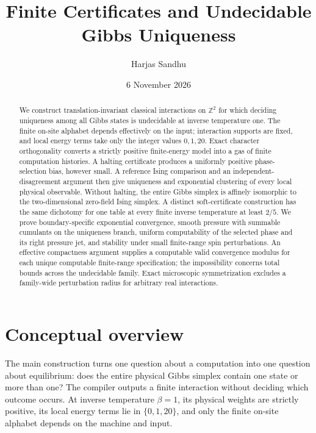 \documentclass[11pt,reqno]{amsart}
\title[Finite certificates and Gibbs uniqueness]{Finite Certificates and Undecidable Gibbs Uniqueness}
\author{Harjas Sandhu}
\date{6 November 2026}
\numberwithin{equation}{section}
\theoremstyle{definition}
\theoremstyle{remark}
\newcommand{\Z}{\mathbb Z}
\begin{document}
\raggedbottom
\begin{abstract}
We construct translation-invariant classical interactions on $\Z^2$ for which deciding uniqueness among all Gibbs states is undecidable at inverse temperature one. The finite on-site alphabet depends effectively on the input; interaction supports are fixed, and local energy terms take only the integer values $0,1,20$. Exact character orthogonality converts a strictly positive finite-energy model into a gas of finite computation histories. A halting certificate produces a uniformly positive phase-selection bias, however small. A reference Ising comparison and an independent-disagreement argument then give uniqueness and exponential clustering of every local physical observable. Without halting, the entire Gibbs simplex is affinely isomorphic to the two-dimensional zero-field Ising simplex. A distinct soft-certificate construction has the same dichotomy for one table at every finite inverse temperature at least $2/5$. We prove boundary-specific exponential convergence, smooth pressure with summable cumulants on the uniqueness branch, uniform computability of the selected phase and its right pressure jet, and stability under small finite-range spin perturbations. An effective compactness argument supplies a computable valid convergence modulus for each unique computable finite-range specification; the impossibility concerns total bounds across the undecidable family. Exact microscopic symmetrization excludes a family-wide perturbation radius for arbitrary real interactions.
\end{abstract}
\maketitle
\setcounter{tocdepth}{1}
\tableofcontents
\clearpage

\section*{Conceptual overview}
\label{sec:overview}

The main construction turns one question about a computation into one question about equilibrium: does the entire physical Gibbs simplex contain one state or more than one? The compiler outputs a finite interaction without deciding which outcome occurs. At inverse temperature $\beta=1$, its physical weights are strictly positive, its local energy terms lie in $\{0,1,20\}$, and only the finite on-site alphabet depends on the machine and input.
\end{document}
